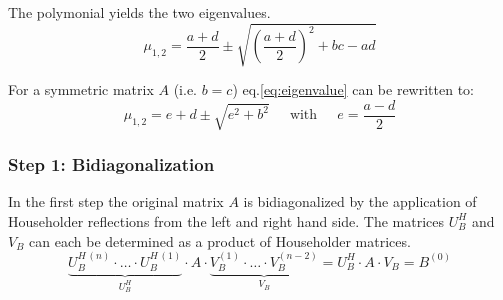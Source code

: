 The polymonial yields the two eigenvalues.
\begin{equation}
\label{eq:eigenvalue}
\mu_{1,2} = \dfrac{a + d}{2} \pm \sqrt{\left(\dfrac{a + d}{2}\right)^2 + bc - ad}
\end{equation}

For a symmetric matrix $A$ (i.e. $b = c$) eq.\eqref{eq:eigenvalue} can
be rewritten to:
\begin{equation}
\label{eq:eigenvalue_sym}
\mu_{1,2} = e + d  \pm \sqrt{e^2 + b^2}
\;\;\;\; \textrm{ with } \;\;\;\;
e = \dfrac{a - d}{2}
\end{equation}

\subsubsection{Step 1: Bidiagonalization}

In the first step the original matrix $A$ is bidiagonalized by the
application of Householder reflections from the left and right hand
side.  The matrices $U_B^H$ and $V_B$ can each be determined as a
product of Householder matrices.
\begin{equation}
\underbrace{U_B^{H\,(n)}\cdot\ldots\cdot U_B^{H\,(1)}}_{U_B^H}\cdot A\cdot
\underbrace{V_B^{(1)}\cdot\ldots\cdot V_B^{(n-2)}}_{V_B}
= U_B^H\cdot A\cdot V_B = B^{(0)}
\end{equation}

